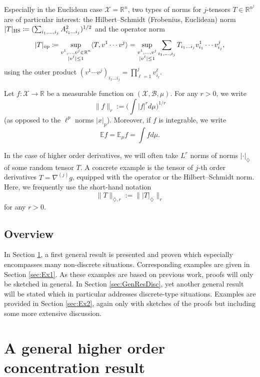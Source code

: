 \documentclass[a4paper,12pt]{amsart}
\numberwithin{equation}{section}
\theoremstyle{remark}
\DeclarePairedDelimiter	{\abs}		{\lvert}	{\rvert}
\DeclarePairedDelimiter	{\skal}		{\langle}	{\rangle}
\def\E{{\mathbb E}}
\def\R{{\mathbb R}}
\begin{document}
Especially in the Euclidean case $\mathcal{X} = \R^n$, two types of norms for $j$-tensors $T \in \R^{n^j}$ are of particular interest: the Hilbert--Schmidt (Frobenius, Euclidean) norm $\abs{T}_\mathrm{HS} \coloneqq (\sum_{i_1, \ldots, i_j} A_{i_1 \ldots i_j}^2)^{1/2}$ and the operator norm
\begin{align*}				%
	\abs{T}_\mathrm{\mathrm{op}} \coloneqq \sup_{\substack{v^1, \ldots, v^j \in \R^n \\ \abs{v^\ell} \le 1}} \skal{T, v^1 \cdots v^j} = \sup_{\substack{v^1, \ldots, v^j \\ \abs{v^\ell} \le 1}} \sum_{i_1,\ldots,i_j} T_{i_1 \ldots i_j} v^1_{i_1} \cdots v^j_{i_j},
\end{align*}
using the outer product $(v^1 \cdots v^j)_{i_1 \ldots i_j} = \prod_{\ell = 1}^j v^\ell_{i_\ell}$.

Let $f \colon \mathcal{X} \to \R$ be a measurable function on $(\mathcal{X}, \mathcal{B}, \mu)$. For any $r > 0$, we write
\[
\lVert f \rVert_r := \Big( \int \lvert f \rvert^r d\mu \Big)^{1/r}
\]
(as opposed to the $\ell^p$ norms $\lvert x \rvert_p$). Moreover, if $f$ is integrable, we write
\[
\E f = \E_\mu f = \int f d\mu.
\]

In the case of higher order derivatives, we will often take $L^r$ norms of norms $\lvert \cdot \rvert_\diamondsuit$ of some random tensor $T$. A concrete example is the tensor of $j$-th order derivatives $T = \nabla^{(j)} g$, equipped with the operator or the Hilbert--Schmidt norm. Here, we frequently use the short-hand notation
\[
\lVert T \rVert_{\diamondsuit, r} := \lVert \lvert T \rvert_\diamondsuit \rVert_r
\]
for any $r > 0$.

\subsection{Overview}

In Section \ref{sec:GenRes}, a first general result is presented and proven which especially encompasses many non-discrete situations. Corresponding examples are given in Section \ref{sec:Ex1}. As these examples are based on previous work, proofs will only be sketched in general. In Section \ref{sec:GenResDisc}, yet another general result will be stated which in particular addresses discrete-type situations. Examples are provided in Section \ref{sec:Ex2}, again only with sketches of the proofs but including some more extensive discussion.

\section{A general higher order concentration result}\label{sec:GenRes}
\end{document}
